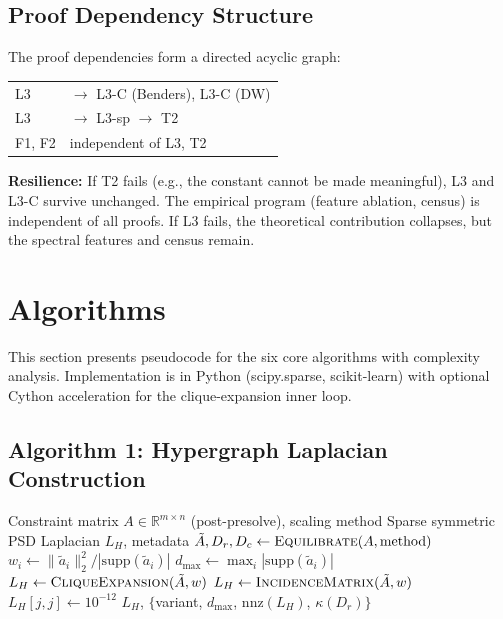 \documentclass[12pt]{article}
\begin{document}
\subsection{Proof Dependency Structure}

The proof dependencies form a directed acyclic graph:
\begin{center}
\begin{tabular}{ll}
L3 & $\longrightarrow$ L3-C (Benders), L3-C (DW) \\
L3 & $\longrightarrow$ L3-sp $\longrightarrow$ T2 \\
F1, F2 & independent of L3, T2
\end{tabular}
\end{center}
\textbf{Resilience:} If T2 fails (e.g., the constant cannot be made
meaningful), L3 and L3-C survive unchanged.  The empirical program
(feature ablation, census) is independent of all proofs.  If L3 fails,
the theoretical contribution collapses, but the spectral features and
census remain.


\section{Algorithms}
\label{sec:algorithms}

This section presents pseudocode for the six core algorithms with complexity
analysis.  Implementation is in Python (scipy.sparse, scikit-learn) with
optional Cython acceleration for the clique-expansion inner loop.

\subsection{Algorithm 1: Hypergraph Laplacian Construction}

\begin{algorithm}[ht]
\caption{Hypergraph Laplacian Construction}
\label{alg:laplacian}
\begin{algorithmic}[1]
\Require Constraint matrix $A \in \mathbb{R}^{m \times n}$ (post-presolve), scaling method
\Ensure Sparse symmetric PSD Laplacian $L_H$, metadata
\State $\tilde{A}, D_r, D_c \gets \textsc{Equilibrate}(A, \text{method})$
  \State $w_i \gets \|\tilde{a}_i\|_2^2 / |\mathrm{supp}(\tilde{a}_i)|$
\EndFor
\State $d_{\max} \gets \max_i |\mathrm{supp}(\tilde{a}_i)|$
  \State $L_H \gets \textsc{CliqueExpansion}(\tilde{A}, w)$
\Else
  \State $L_H \gets \textsc{IncidenceMatrix}(\tilde{A}, w)$
\EndIf
{}
   $L_H[j,j] \gets 10^{-12}$
  \EndIf
\EndFor
\State \Return $L_H$, $\{$variant, $d_{\max}$, $\mathrm{nnz}(L_H)$, $\kappa(D_r)$$\}$
\end{algorithmic}
\end{algorithm}
\end{document}
